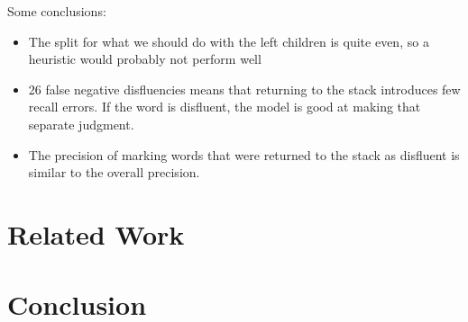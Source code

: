 \documentclass[11pt,letterpaper]{article}
\begin{document}
Some conclusions:
\begin{itemize}
\item The split for what we should do with the left children is quite even, so a
  heuristic would probably not perform well
\item 26 false negative disfluencies means that returning to the stack introduces
  few recall errors. If the word is disfluent, the model is good at making
  that separate judgment.
\item The precision of marking words that were returned to the stack as disfluent
  is similar to the overall precision.
\end{itemize}

\section{Related Work}


\section{Conclusion}




\end{document}
